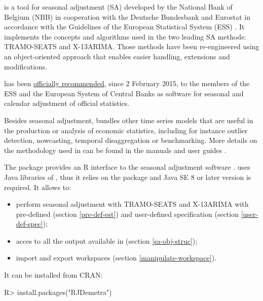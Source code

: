 \documentclass[article]{jss}
\providecommand{\tightlist}{%
  \setlength{\itemsep}{0pt}\setlength{\parskip}{0pt}}
\begin{document}
 is a tool for seasonal adjustment (SA) developed by
the National Bank of Belgium (NBB) in cooperation with the Deutsche
Bundesbank and Eurostat in accordance with the Guidelines of the
European Statistical System (ESS) \citep{eurostat2015guidelines}. It
implements the concepts and algorithms used in the two leading SA
methods: TRAMO-SEATS and X-13ARIMA. Those methods have been
re-engineered using an object-oriented approach that enables easier
handling, extensions and modifications.

 has been
\href{https://ec.europa.eu/eurostat/cros/system/files/Jdemetra_\%20release.pdf}{officially
recommended}, since 2 February 2015, to the members of the ESS and the
European System of Central Banks as software for seasonal and calendar
adjustment of official statistics.

Besides seasonal adjustment,  bundles other time
series models that are useful in the production or analysis of economic
statistics, including for instance outlier detection, nowcasting,
temporal disaggregation or benchmarking. More details on the methodology
used in  can be found in the 
manuals and user guides
\citep{grudkowska2015jdemetrarm, grudkowska2015jdemetraug}.

The package  provides an R interface to the seasonal
adjustment software .  uses Java
libraries of , thus it relies on the 
\citep{rJava} package and Java SE 8 or later version is required. It
allows to:

\begin{itemize}
\tightlist
\item
  perform seasonal adjustment with TRAMO-SEATS and X-13ARIMA with
  pre-defined (section \ref{pre-def-est}) and user-defined specification
  (section \ref{user-def-spec});\\
\item
  acces to all the output available in  (section
  \ref{sa-obj-struc});\\
\item
  import and export  workspaces (section
  \ref{manipulate-workspace}).
\end{itemize}

It can be installed from CRAN:

\begin{CodeChunk}

\begin{CodeInput}
R> install.packages("RJDemetra")
\end{CodeInput}
\end{CodeChunk}
\end{document}
